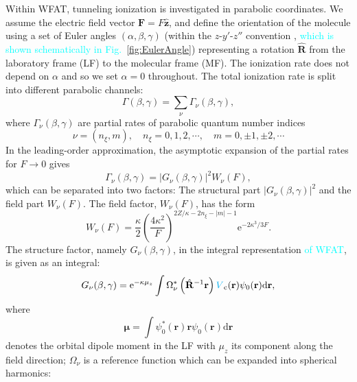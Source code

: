 \documentclass[preprint,12pt]{elsarticle} %
\newcommand{\bn}[1]{\mathbf{#1}}    %
\newcommand{\bi}[1]{\bm{#1}}        %
\renewcommand{\rm}[1]{\mathrm{#1}}    %
\newcommand{\dd}{\mathrm{d}}    %
\newcommand{\ee}{\mathrm{e}}    %
\newcommand{\abs}[1]{\lvert #1 \rvert}  %
\newcommand{\cyan}[1]{\textcolor{cyan}{#1}}     %
\begin{document}
Within WFAT, tunneling ionization is investigated in parabolic coordinates. We assume the electric field vector $\bn{F}=F\hat{\bn{z}}$, and define the orientation of the molecule using a set of Euler angles $(\alpha,\beta,\gamma)$ (within the $z$-$y'$-$z''$ convention \cite{madsen_structure_2017}, \cyan{which is shown schematically in Fig.~\ref{fig:EulerAngle}}) representing a rotation $\hat{\bn{R}}$ from the laboratory frame (LF) to the molecular frame (MF). The ionization rate does not depend on $\alpha$ and so we set $\alpha=0$ throughout. The total ionization rate is split into different parabolic channels:
\begin{equation}
    \Gamma(\beta, \gamma)=\sum_\nu \Gamma_\nu(\beta, \gamma),
\end{equation}
where $\Gamma_\nu(\beta, \gamma)$ are partial rates of parabolic quantum number indices
\begin{equation}
    \nu=(n_\xi,m), \quad n_\xi=0,1,2,\cdots, \quad m=0,\pm 1,\pm 2,\cdots
\end{equation}
In the leading-order approximation, the asymptotic expansion of the partial rates for $F\rightarrow 0$ gives
\begin{equation}
    \Gamma_{\nu}(\beta, \gamma) = \abs{G_\nu(\beta, \gamma)}^2 W_{\nu}(F),
\end{equation}
which can be separated into two factors: The structural part $\abs{G_\nu(\beta, \gamma)}^2$ and the field part $W_{\nu}(F)$.
The field factor, $W_{\nu}(F)$, has the form \cite{ammosov_tunnel_1986,delone_tunneling_1998}
\begin{equation}
    W_{\nu}(F) = \frac{\kappa}{2} \left(\frac{4\kappa^2}{F}\right)^{2Z/\kappa-2n_\xi-\abs{m}-1} \ee^{-{2\kappa^3}/{3F}}.
\end{equation}
The structure factor, namely $G_\nu(\beta, \gamma)$, in the integral representation \cyan{of WFAT}, is given as an integral:
\begin{equation}
    G_\nu (\beta,\gamma) = \ee^{-\kappa\mu_z} \int \Omega_\nu^* \left(\hat{\bn{R}}^{-1} \bn{r}\right) \cyan{V}_{\rm{c}}(\bn{r}) \psi_0(\bn{r}) \dd \bn{r},
    \label{eq:StructFactorExp}
\end{equation}
where
\begin{equation}
    \bi{\mu} = \int \psi_0^*(\bn{r}) \bn{r} \psi_0(\bn{r}) \dd \bn{r}
\end{equation}
denotes the orbital dipole moment in the LF with $\mu_z$ its component along the field direction;
$\Omega_\nu$ is a reference function which can be expanded into spherical harmonics:
\end{document}
